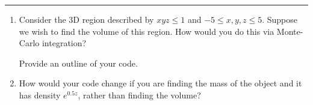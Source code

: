 \documentclass[12pt,letterpaper,noanswers]{exam}
\begin{document}

\vspace{0.2cm}
\hrule
\vspace{0.2cm}


    
\eject
\begin{enumerate}[resume]
\item Consider the 3D region described by $xyz\leq 1$ and $-5\leq x,y,z\leq 5$.  Suppose we wish to find the volume of this region.  How would you do this via Monte-Carlo integration?  

Provide an outline of your code.
\vspace{3in}
\item How would your code change if you are finding the mass of the object and it has density $e^{0.5z}$, rather than finding the volume?
\vfill
\end{enumerate}
    



\end{document}
